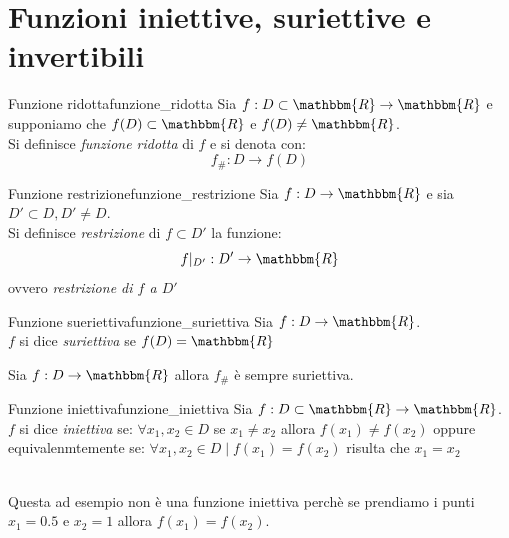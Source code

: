 \documentclass[12pt]{report}
\newcounter{definition}
\begin{document}
	\section{Funzioni iniettive, suriettive e invertibili}
	\begin{definition}{Funzione ridotta}{funzione_ridotta}
		Sia $f: D \subset \mathbbm{R} \to \mathbbm{R}$ e supponiamo che $f(D) \subset \mathbbm{R}$ e $f(D) \neq \mathbbm{R}$. \\
		Si definisce \textit{funzione ridotta} di $f$ e si denota con:
		\[
		f_{\#}: D \to f(D)
		\]
	\end{definition}
	\begin{definition}{Funzione restrizione}{funzione_restrizione}
		Sia $f: D \to \mathbbm{R}$ e sia $D' \subset D, D' \neq D$. \\
		Si definisce \textit{restrizione} di $f \subset D'$ la funzione:
		\[
		f|_{D'}: D' \to \mathbbm{R}
		\]
		ovvero \textit{restrizione di $f$ a $D'$}
	\end{definition}
	\begin{definition}{Funzione sueriettiva}{funzione_suriettiva}
		Sia $f: D \to \mathbbm{R}$. \\
		$f$ si dice \textit{suriettiva} se $f(D) = \mathbbm{R}$
	\end{definition}
	\begin{note}{}{}
		Sia $f: D \to \mathbbm{R}$ allora $f_{\#}$ è sempre suriettiva.
	\end{note}
	\begin{definition}{Funzione iniettiva}{funzione_iniettiva}
		Sia $f: D \subset \mathbbm{R} \to \mathbbm{R}$. \\
		$f$ si dice \textit{iniettiva} se: $\forall x_1, x_2 \in D$ se $x_1 \neq x_2$ allora $f(x_1) \neq f(x_2)$ oppure equivalenmtemente se: $\forall x_1, x_2 \in D \mid f(x_1) = f(x_2)$ risulta che $x_1 = x_2$
	\end{definition}
	 \\
	Questa ad esempio non è una funzione iniettiva perchè se prendiamo i punti $x_1 = 0.5$ e $x_2 = 1$ allora $f(x_1) = f(x_2)$.
\end{document}
